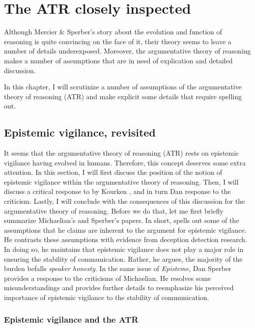 \chapter{The ATR closely inspected}
\label{ch:scrutiny}

Although Mercier \& Sperber's story about the evolution and function of reasoning is quite convincing on the face of it, their theory seems to leave a number of details underexposed. Moreover, the argumentative theory of reasoning makes a number of assumptions that are in need of explication and detailed discussion.

In this chapter, I will scrutinize a number of assumptions of the argumentative theory of reasoning (ATR) and make explicit some details that require spelling out.

\section{Epistemic vigilance, revisited}
\label{sec:EV-scrutiny}

It seems that the argumentative theory of reasoning (ATR) rests on epistemic vigilance having evolved in humans. Therefore, this concept deserves some extra attention.
In this section, I will first discuss the position of the notion of epistemic vigilance within the argumentative theory of reasoning. Then, I will discuss a critical response to \citet{Sperber10} by Kourken \citet{Michaelian13}, and in turn Dan  response to the criticism. Lastly, I will conclude with the consequences of this discussion for the argumentative theory of reasoning.
Before we do that, let me first briefly summarize Michaelian's and Sperber's papers. In short, \citet{Michaelian13} spells out some of the assumptions that he claims are inherent to the argument for epistemic vigilance. He contrasts these assumptions with evidence from deception detection research. In doing so, he maintains that epistemic vigilance does not play a major role in ensuring the stability of communication. Rather, he argues, the majority of the burden befalls \emph{speaker honesty}. In the same \citeyear{Sperber13} issue of \emph{Episteme}, Dan Sperber provides a response to the criticisms of Michaelian. He resolves some misunderstandings and provides further details to reemphasize his perceived importance of epistemic vigilance to the stability of communication.

\subsection{Epistemic vigilance and the ATR}
\label{sec:epi-vigil-atr}

